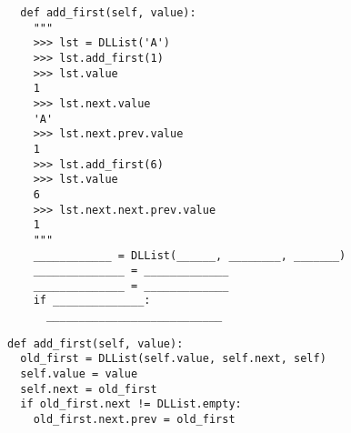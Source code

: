 \begin{blocksection}
\begin{lstlisting}
  def add_first(self, value):
    """
    >>> lst = DLList('A')
    >>> lst.add_first(1)
    >>> lst.value
    1
    >>> lst.next.value
    'A'
    >>> lst.next.prev.value
    1
    >>> lst.add_first(6)
    >>> lst.value
    6
    >>> lst.next.next.prev.value
    1
    """
    ____________ = DLList(______, ________, _______)
    ______________ = _____________
    ______________ = _____________
    if ______________:
      ___________________________
\end{lstlisting}

\begin{solution}
\begin{lstlisting}
def add_first(self, value):
  old_first = DLList(self.value, self.next, self)
  self.value = value
  self.next = old_first
  if old_first.next != DLList.empty:
    old_first.next.prev = old_first
\end{lstlisting}
\end{solution}
\end{blocksection}


